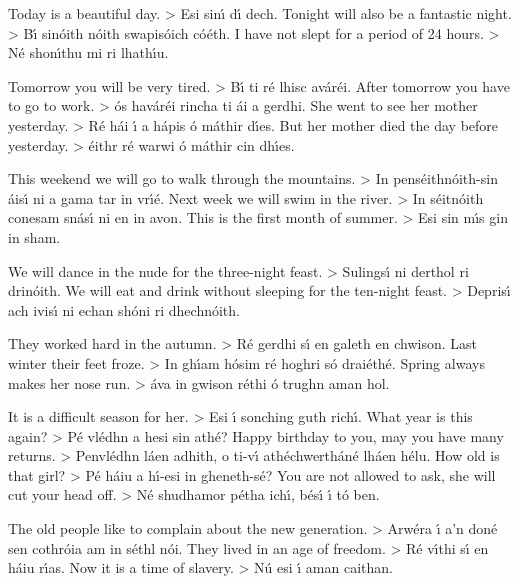 Today is a beautiful day. > Esi sin\'{\i} d\'{\i} dech.
Tonight will also be a fantastic night. > B\'{\i} sin\'{o}ith n\'{o}ith swapis\'{o}ich c\'{o}\'{e}th.
I have not slept for a period of 24 hours. > N\'{e} shon\'{\i}thu mi ri lhath\'{\i}u.

Tomorrow you will be very tired. > B\'{\i} ti r\'{e} lhisc av\'{a}r\'{e}i.
After tomorrow you have to go to work. > \'{o}s hav\'{a}r\'{e}i rincha ti \'{a}i a gerdhi.
She went to see her mother yesterday. > R\'{e} h\'{a}i \'{\i} a h\'{a}pis \'{o} m\'{a}thir d\'{\i}es.
But her mother died the day before yesterday. > \'{e}ithr r\'{e} warwi \'{o} m\'{a}thir cin dh\'{\i}es.

This weekend we will go to walk through the mountains. > In pens\'{e}ithn\'{o}ith-sin \'{a}is\'{\i} ni a gama 
                                                                                               tar in vr\'{\i}\'{e}.
Next week we will swim in the river. > In s\'{e}itn\'{o}ith conesam sn\'{a}s\'{\i} ni en in avon.
This is the first month of summer. > Esi sin m\'{\i}s gin in sham.

We will dance in the nude for the three-night feast. > Sulings\'{\i} ni derthol ri drin\'{o}ith.
We will eat and drink without sleeping for the ten-night feast. > Depris\'{\i} ach ivis\'{\i} ni echan 
                                                                                                       sh\'{o}ni ri dhechn\'{o}ith.

They worked hard in the autumn. > R\'{e} gerdhi s\'{\i} en galeth en chwison.
Last winter their feet froze. > In gh\'{\i}am h\'{o}sim r\'{e} hoghri s\'{o} drai\'{e}th\'{e}.
Spring always makes her nose run. > \'{a}va in gwison r\'{e}thi \'{o} trughn aman hol.

It is a difficult season for her. > Esi \'{\i} sonching guth rich\'{\i}.
What year is this again? > P\'{e} vl\'{e}dhn a hesi sin ath\'{e}?
Happy birthday to you, may you have many returns. > Penvl\'{e}dhn l\'{a}en adhith, o ti-v\'{\i}  
                                                                                        ath\'{e}chwerth\'{a}n\'{e} lh\'{a}en h\'{e}lu.
How old is that girl? > P\'{e} h\'{a}iu a h\'{\i}-esi in gheneth-s\'{e}?
You are not allowed to ask, she will cut your head off. > N\'{e} shudhamor p\'{e}tha ich\'{\i}, b\'{e}s\'{\i} \'{\i} t\'{o} 
                                                                                           ben.

The old people like to complain about the new generation. > Arw\'{e}ra \'{\i} a’n don\'{e} sen cothr\'{o}ia 
                                                                                                  am in s\'{e}thl n\'{o}i.
They lived in an age of freedom. > R\'{e} v\'{\i}thi s\'{\i} en h\'{a}iu r\'{\i}as.
Now it is a time of slavery. > N\'{u} esi \'{\i} aman caithan.
